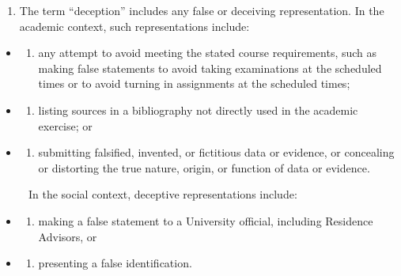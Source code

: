 \begin{enumerate}
\def\labelenumi{\arabic{enumi}.}
\setcounter{enumi}{3}
\tightlist
\item
  The term ``deception'' includes any false or deceiving representation. In the academic context, such representations include:
\end{enumerate}

\begin{itemize}
\item
  \begin{enumerate}
  \def\labelenumi{(\alph{enumi})}
  \tightlist
  \item
    any attempt to avoid meeting the stated course requirements, such as making false statements to avoid taking examinations at the scheduled times or to avoid turning in assignments at the scheduled times;
  \end{enumerate}
\item
  \begin{enumerate}
  \def\labelenumi{(\alph{enumi})}
  \setcounter{enumi}{1}
  \tightlist
  \item
    listing sources in a bibliography not directly used in the academic exercise; or
  \end{enumerate}
\item
  \begin{enumerate}
  \def\labelenumi{(\alph{enumi})}
  \setcounter{enumi}{2}
  \tightlist
  \item
    submitting falsified, invented, or fictitious data or evidence, or concealing or distorting the true nature, origin, or function of data or evidence.
  \end{enumerate}
\end{itemize}

~~~~~In the social context, deceptive representations include:

\begin{itemize}
\item
  \begin{enumerate}
  \def\labelenumi{(\alph{enumi})}
  \tightlist
  \item
    making a false statement to a University official, including Residence Advisors, or
  \end{enumerate}
\item
  \begin{enumerate}
  \def\labelenumi{(\alph{enumi})}
  \setcounter{enumi}{1}
  \tightlist
  \item
    presenting a false identification.
  \end{enumerate}
\end{itemize}

